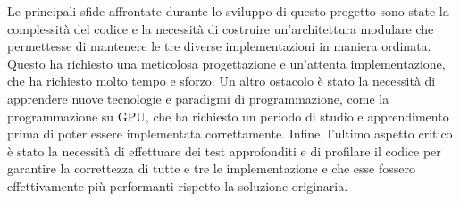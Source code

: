 Le principali sfide affrontate durante lo sviluppo di questo progetto sono state
la complessità del codice e la necessità di costruire un'architettura modulare che
permettesse di mantenere le tre diverse implementazioni in maniera ordinata.
Questo ha richiesto una meticolosa progettazione e un'attenta implementazione, che
ha richiesto molto tempo e sforzo. Un altro ostacolo è stato la necessità di
apprendere nuove tecnologie e paradigmi di programmazione, come la programmazione
su GPU, che ha richiesto un periodo di studio e apprendimento prima di poter
essere implementata correttamente. Infine, l'ultimo aspetto critico è stato la
necessità di effettuare dei test approfonditi e di profilare il codice per
garantire la correttezza di tutte e tre le implementazione e che esse fossero
effettivamente più performanti rispetto la soluzione originaria.